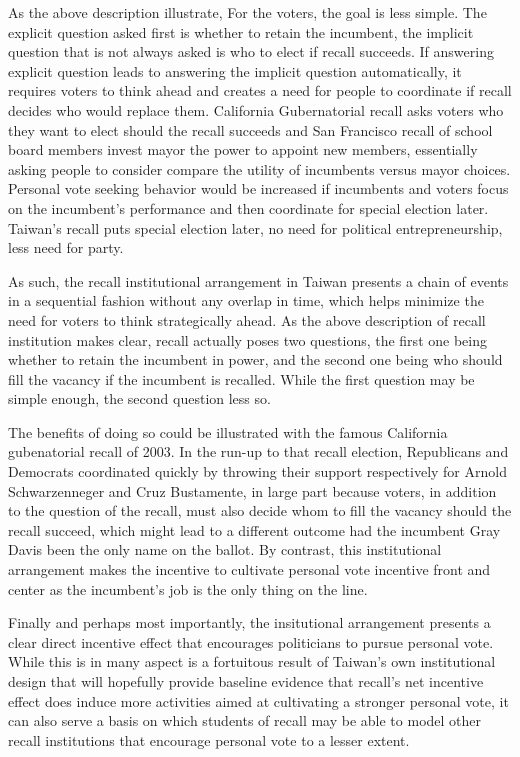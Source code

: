 \documentclass[hyphens, crop=false]{standalone}
\begin{document}
	
	
	
	
	
	As the above description illustrate,
	For the voters, the goal is less simple.
	The explicit question asked first is whether to retain the incumbent,
	the implicit question that is not always asked is who to elect if recall succeeds.
	If answering explicit question leads to answering the implicit question automatically,
	it requires voters to think ahead and creates a need for people to coordinate
	if recall decides who would replace them.
	California Gubernatorial recall asks voters who they want to elect should the recall succeeds
	and San Francisco recall of school board members invest mayor the power to appoint new members,
	essentially asking people to consider compare the utility of incumbents versus mayor choices.
	Personal vote seeking behavior would be increased
	if incumbents and voters focus on the incumbent's performance 
	and then coordinate for special election later.
	Taiwan's recall puts special election later,
	no need for political entrepreneurship, less need for party.
	
	As such, the recall institutional
	arrangement in Taiwan
	presents a chain of events in a sequential fashion
	without any overlap in time,
	which helps minimize the need for voters to think strategically ahead.
	As the above description of recall institution makes clear,
	recall actually poses two questions,
	the first one being whether to retain the incumbent in power,
	and the second one being who should fill the vacancy if the incumbent is recalled.
	While the first question may be simple enough,
	the second question less so.
	

	The benefits of doing so could be illustrated with the famous California gubenatorial recall of 2003.
	In the run-up to that recall election,
	Republicans and Democrats coordinated quickly by throwing their support
	respectively for Arnold Schwarzenneger and Cruz Bustamente,
	in large part because voters, in addition to the question of the recall,
	must also decide whom to fill the vacancy should the recall succeed,
	which might lead to a different outcome
	had the incumbent Gray Davis been the only name on the ballot.
	By contrast,
	this institutional arrangement makes the incentive to cultivate personal vote incentive front and center
	as the incumbent's job is the only thing on the line.
	
	Finally and perhaps most importantly,
	the insitutional arrangement presents a clear direct incentive effect
	that encourages politicians to
	pursue personal vote.
	While this is in many aspect is a fortuitous result of Taiwan's own
	institutional design that will hopefully provide baseline evidence that
	recall's net incentive effect does induce more
	activities aimed at cultivating a stronger personal vote,
	it can also serve a basis on which
	students of recall may be able to model
	other recall institutions that encourage personal vote to a lesser extent.
	
	

	
		
	
	
\end{document}
